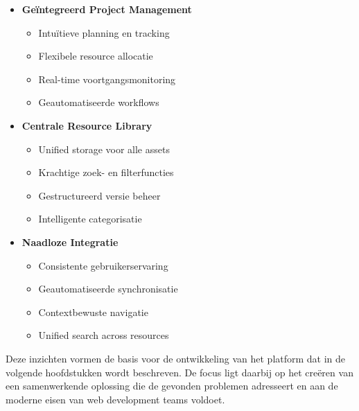 \begin{itemize}
    \item \textbf{Geïntegreerd Project Management}
    \begin{itemize}
        \item Intuïtieve planning en tracking
        \item Flexibele resource allocatie
        \item Real-time voortgangsmonitoring
        \item Geautomatiseerde workflows
    \end{itemize}
    
    \item \textbf{Centrale Resource Library}
    \begin{itemize}
        \item Unified storage voor alle assets
        \item Krachtige zoek- en filterfuncties
        \item Gestructureerd versie beheer
        \item Intelligente categorisatie
    \end{itemize}
    
    \item \textbf{Naadloze Integratie}
    \begin{itemize}
        \item Consistente gebruikerservaring
        \item Geautomatiseerde synchronisatie
        \item Contextbewuste navigatie
        \item Unified search across resources
    \end{itemize}
\end{itemize}

Deze inzichten vormen de basis voor de ontwikkeling van het platform dat in de volgende hoofdstukken wordt beschreven. De focus ligt daarbij op het creëren van een samenwerkende oplossing die de gevonden problemen adresseert en aan de moderne eisen van web development teams voldoet.

